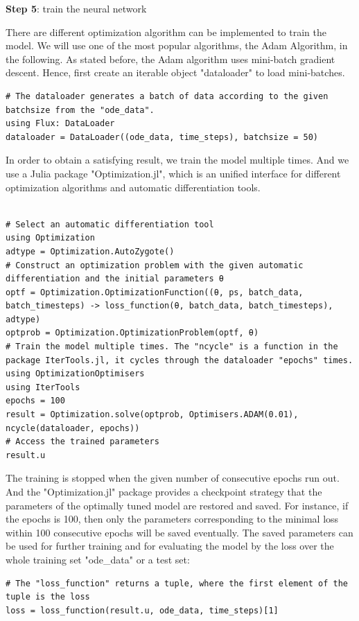 \documentclass[
	parskip, 			   %
	twoside, 			   %
	DIV=14, 			   %
	BCOR=15.0mm, 		   %
	headsepline, 		   %
	open=right, 		   %
	captions=tableheading, %
	bibliography=totoc,    %
	numbers=noenddot       %
]{scrreprt}
\begin{document}
\textbf{Step 5}: train the neural network

There are different optimization algorithm can be implemented to train the model. We will use one of the most popular algorithms, the Adam Algorithm, in the following. As stated before, the Adam algorithm uses mini-batch gradient descent. Hence, first create an iterable object "dataloader" to load mini-batches.

\begin{verbatim}
# The dataloader generates a batch of data according to the given batchsize from the "ode_data".
using Flux: DataLoader
dataloader = DataLoader((ode_data, time_steps), batchsize = 50)
\end{verbatim}

In order to obtain a satisfying result, we train the model multiple times. And we use a Julia package "Optimization.jl", which is an unified interface for different optimization algorithms and automatic differentiation tools.

\begin{verbatim}

# Select an automatic differentiation tool
using Optimization
adtype = Optimization.AutoZygote()
# Construct an optimization problem with the given automatic differentiation and the initial parameters θ
optf = Optimization.OptimizationFunction((θ, ps, batch_data, batch_timesteps) -> loss_function(θ, batch_data, batch_timesteps), adtype)
optprob = Optimization.OptimizationProblem(optf, θ)
# Train the model multiple times. The "ncycle" is a function in the package IterTools.jl, it cycles through the dataloader "epochs" times.
using OptimizationOptimisers
using IterTools
epochs = 100
result = Optimization.solve(optprob, Optimisers.ADAM(0.01), ncycle(dataloader, epochs))
# Access the trained parameters
result.u
\end{verbatim}

The training is stopped when the given number of consecutive epochs run out. And the "Optimization.jl" package provides a checkpoint strategy that the parameters of the optimally tuned model are restored and saved. For instance, if the epochs is 100, then only the parameters corresponding to the minimal loss within 100 consecutive epochs will be saved eventually.  The saved parameters can be used for further training and for evaluating the model by the loss over the whole training set "ode\_data" or a test set:
\begin{verbatim}
# The "loss_function" returns a tuple, where the first element of the tuple is the loss
loss = loss_function(result.u, ode_data, time_steps)[1]
\end{verbatim}
\end{document}
